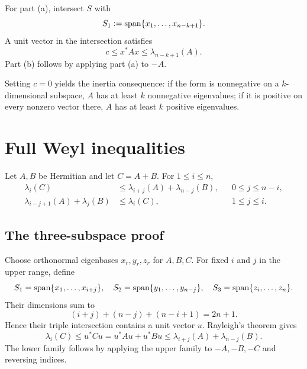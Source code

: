 For part (a), intersect $S$ with
\[
  S_1:=\operatorname{span}\{x_1,\dots,x_{n-k+1}\}.
\]
A unit vector in the intersection satisfies
\begin{equation}
  c\le x^*Ax\le\lambda_{n-k+1}(A). \tag{HJ-4.2.11}
\end{equation}
Part (b) follows by applying part (a) to $-A$.

Setting $c=0$ yields the inertia consequence: if the form is nonnegative on a $k$-dimensional subspace, $A$ has at least $k$ nonnegative eigenvalues; if it is positive on every nonzero vector there, $A$ has at least $k$ positive eigenvalues.


\section{Full Weyl inequalities}


Let $A,B$ be Hermitian and let $C=A+B$. For $1\le i\le n$,
\begin{align}
  \lambda_i(C)
  &\le \lambda_{i+j}(A)+\lambda_{n-j}(B),
  &&0\le j\le n-i, \tag{HJ-Weyl-upper}\\
  \lambda_{i-j+1}(A)+\lambda_j(B)
  &\le \lambda_i(C),
  &&1\le j\le i. \tag{HJ-Weyl-lower}
\end{align}

\subsection{The three-subspace proof}

Choose orthonormal eigenbases $x_r,y_r,z_r$ for $A,B,C$. For fixed $i$ and $j$ in the upper range, define
\[
  S_1=\operatorname{span}\{x_1,\dots,x_{i+j}\},
  \quad
  S_2=\operatorname{span}\{y_1,\dots,y_{n-j}\},
  \quad
  S_3=\operatorname{span}\{z_i,\dots,z_n\}.
\]
Their dimensions sum to
\[
  (i+j)+(n-j)+(n-i+1)=2n+1.
\]
Hence their triple intersection contains a unit vector $u$. Rayleigh's theorem gives
\[
  \lambda_i(C)
  \le u^*Cu
  =u^*Au+u^*Bu
  \le\lambda_{i+j}(A)+\lambda_{n-j}(B).
\]
The lower family follows by applying the upper family to $-A,-B,-C$ and reversing indices.

